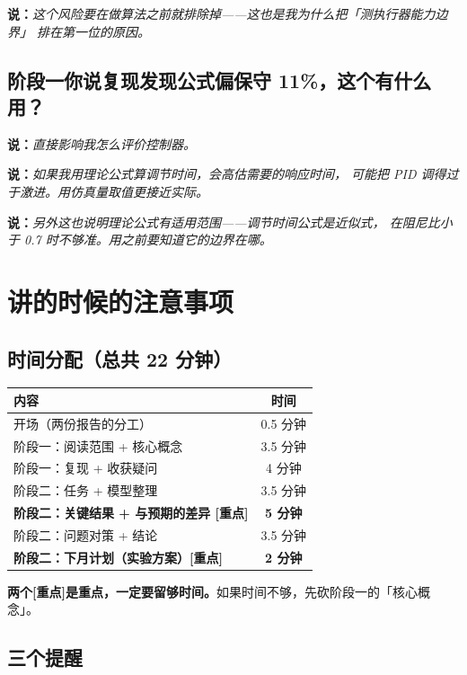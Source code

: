 \documentclass[11pt,a4paper]{ctexart}
\newcommand{\shuo}[1]{\par{\color{cBlue}\bfseries 说：}{\itshape #1}\par}
\begin{document}
\shuo{这个风险要在做算法之前就排除掉——这也是我为什么把「测执行器能力边界」
排在第一位的原因。}

\subsection{阶段一你说复现发现公式偏保守 11\%，这个有什么用？}

\shuo{直接影响我怎么评价控制器。}

\shuo{如果我用理论公式算调节时间，会高估需要的响应时间，
可能把 PID 调得过于激进。用仿真量取值更接近实际。}

\shuo{另外这也说明理论公式有适用范围——调节时间公式是近似式，
在阻尼比小于 0.7 时不够准。用之前要知道它的边界在哪。}

\section{讲的时候的注意事项}

\subsection{时间分配（总共 22 分钟）}

\begin{table}[htbp]
\centering
\begin{tabularx}{\textwidth}{@{}Y c@{}}
\toprule
{} 内容 & 时间 \\
\midrule
开场（两份报告的分工） & 0.5 分钟 \\
阶段一：阅读范围 + 核心概念 & 3.5 分钟 \\
阶段一：复现 + 收获疑问 & 4 分钟 \\
阶段二：任务 + 模型整理 & 3.5 分钟 \\
 \textbf{阶段二：关键结果 + 与预期的差异 [重点]} & \textbf{5 分钟} \\
阶段二：问题对策 + 结论 & 3.5 分钟 \\
 \textbf{阶段二：下月计划（实验方案）[重点]} & \textbf{2 分钟} \\
\bottomrule
\end{tabularx}
\end{table}

\begin{tishi}
\textbf{两个[重点]是重点，一定要留够时间。}如果时间不够，先砍阶段一的「核心概念」。
\end{tishi}

\subsection{三个提醒}
\end{document}
